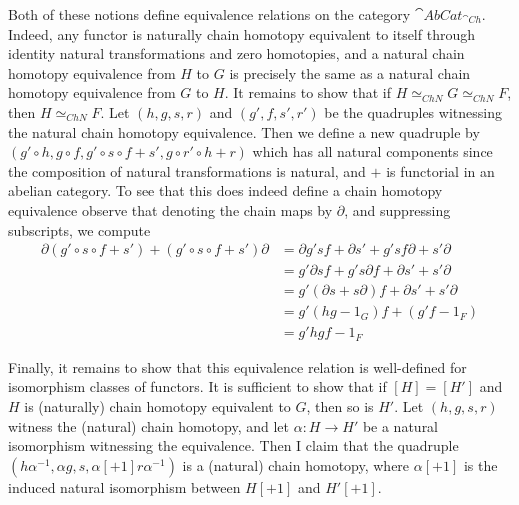 Both of these notions define equivalence relations on the category $\cat{AbCat}_{\cat{Ch}}$. Indeed, any functor is naturally chain homotopy equivalent to itself through identity natural transformations and zero homotopies, and a natural chain homotopy equivalence from $H$ to $G$ is precisely the same as a natural chain homotopy equivalence from $G$ to $H$. It remains to show that if $H\simeq_{ChN}G\simeq_{ChN}F$, then $H\simeq_{ChN}F$. Let $(h,g,s,r)$ and $(g',f,s',r')$ be the quadruples witnessing the natural chain homotopy equivalence. Then we define a new quadruple by $(g'\circ h, g\circ f, g'\circ s\circ f+s', g\circ r'\circ h+r)$ which has all natural components since the composition of natural transformations is natural, and $+$ is functorial in an abelian category. To see that this does indeed define a chain homotopy equivalence observe that denoting the chain maps by $\partial$, and suppressing subscripts, we compute
\begin{align*}
    \partial(g'\circ s\circ f+s')+(g'\circ s\circ f+s')\partial &= \partial g'sf+\partial s'+g'sf\partial + s'\partial \\
    &= g'\partial sf+g's\partial f+\partial s'+s'\partial \\
    &= g'(\partial s+s\partial)f+\partial s'+s'\partial \tag{using the fact $g'$ and $f$ are chain maps} \\
    &= g'(hg-1_G)f + (g'f-1_F) \tag{by definition of the homotopies $s$ and $s'$} \\
    &= g'hgf-1_F
\end{align*}


Finally, it remains to show that this equivalence relation is well-defined for isomorphism classes of functors. It is sufficient to show that if $[H] = [H']$ and $H$ is (naturally) chain homotopy equivalent to $G$, then so is $H'$. Let $(h,g,s,r)$ witness the (natural) chain homotopy, and let $\alpha:H\rightarrow H'$ be a natural isomorphism witnessing the equivalence. Then I claim that the quadruple $(h\alpha^{-1},\alpha g, s, \alpha[+1]r\alpha^{-1})$ is a (natural) chain homotopy, where $\alpha[+1]$ is the induced natural isomorphism between $H[+1]$ and $H'[+1]$. 

